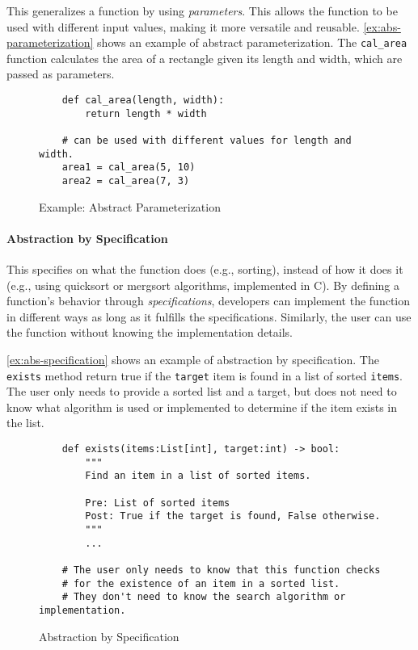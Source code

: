 \documentclass[oneside,11pt,dvipsnames]{book}
\newcommand{\code}[1]{\texttt{#1}}
\begin{document}
This generalizes a function by using \emph{parameters}. This allows the function to be used with different input values, making it more versatile and reusable. \autoref{ex:abs-parameterization} shows an example of abstract parameterization. The \code{cal\_area} function calculates the area of a rectangle given its length and width, which are passed as parameters.

\begin{figure}[h]
    \begin{lstlisting}
    def cal_area(length, width):
        return length * width

    # can be used with different values for length and width.
    area1 = cal_area(5, 10)
    area2 = cal_area(7, 3)
\end{lstlisting}
\caption{Example: Abstract Parameterization}\label{ex:abs-parameterization}
\end{figure}



\paragraph{Abstraction by Specification} This specifies on what the function does (e.g., sorting), instead of how it does it (e.g., using quicksort or mergsort algorithms, implemented in C). By defining a function's behavior through \emph{specifications}, developers can implement the function in different ways as long as it fulfills the specifications. Similarly, the user can use the function without knowing the implementation details.

\autoref{ex:abs-specification} shows an example of abstraction by specification. The \code{exists} method return true if the \code{target} item is found in a list of sorted \code{items}. The user only needs to provide a sorted list and a target, but does not need to know what algorithm is used or implemented to determine if the item exists in the list.

\begin{figure}
\begin{lstlisting}
    def exists(items:List[int], target:int) -> bool:
        """
        Find an item in a list of sorted items.

        Pre: List of sorted items
        Post: True if the target is found, False otherwise.
        """
        ...

    # The user only needs to know that this function checks 
    # for the existence of an item in a sorted list. 
    # They don't need to know the search algorithm or implementation.
\end{lstlisting}
\caption{Abstraction by Specification}\label{ex:abs-specification}
\end{figure}
\end{document}
